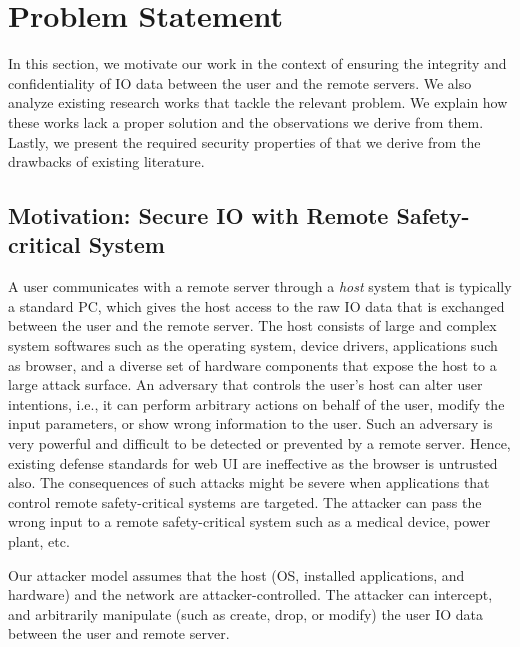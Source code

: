 \section{Problem Statement}
\label{sec:problemStatement}

In this section, we motivate our work in the context of ensuring the integrity and confidentiality of IO data between the user and the remote servers. We also analyze existing research works that tackle the relevant problem. We explain how these works lack a proper solution and the observations we derive from them. Lastly, we present the required security properties of \name that we derive from the drawbacks of existing literature.

\subsection{Motivation: Secure IO with Remote Safety-critical System}

A user communicates with a remote server through a \emph{host} system that is typically a standard PC, which gives the host access to the raw IO data that is exchanged between the user and the remote server. The host consists of large and complex system softwares such as the operating system, device drivers, applications such as browser, and a diverse set of hardware components that expose the host to a large attack surface. An adversary that controls the user's host can alter user intentions, i.e., it can perform arbitrary actions on behalf of the user, modify the input parameters, or show wrong information to the user. Such an adversary is very powerful and difficult to be detected or prevented by a remote server. Hence, existing defense standards for web UI are ineffective as the browser is untrusted also. The consequences of such attacks might be severe when applications that control remote safety-critical systems are targeted. The attacker can pass the wrong input to a remote safety-critical system such as a medical device, power plant, etc.

 Our attacker model assumes that the host (OS, installed applications, and hardware) and the network are attacker-controlled. The attacker can intercept, and arbitrarily manipulate (such as create, drop, or modify) the user IO data between the user and remote server. 

